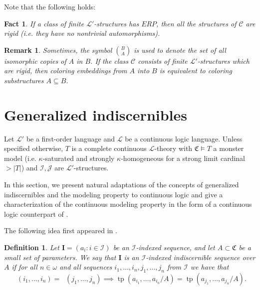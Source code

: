 \documentclass{amsart}
\newtheorem{fact}[teor]{Fact}
\newtheorem{defin}[teor]{Definition}
\newtheorem{remark}[teor]{Remark}
\newtheorem{external claim}[teor]{Claim}
\newcommand{\C}{{\mathfrak C}}
\newcommand{\mL}{\mathcal{L}}
\newcommand{\I}{\mathcal{I}}
\newcommand{\II}{\mathbf{I}}
\DeclareMathOperator{\tp}{{tp}}
\DeclareMathOperator{\qftp}{{tp^{qf}}}
\begin{document}
Note that the following holds:
\begin{fact}
    If a class of finite $\mL'$-structures has $ERP$, then all the structures of $\mathcal{C}$ are rigid (i.e. they have no nontrivial automorphisms).
\end{fact}

\begin{remark}
    Sometimes, the symbol $\binom{B}{A}$ is used to denote the set of all isomorphic copies of $A$ in $B$. If the class $\mathcal{C}$ consists of finite $\mL'$-structures which are rigid, then coloring embeddings from $A$ into $B$ is equivalent to coloring substructures $A\subseteq B$. 
\end{remark}
\section{Generalized indiscernibles}\label{section: modelling property}
Let $\mL'$ be a first-order language and $\mL$ be a continuous logic language. Unless specified otherwise, $T$ is a complete continuous $\mL$-theory with $\C\models T$ a monster model (i.e. $\kappa$-saturated and strongly $\kappa$-homogeneous for a strong limit cardinal $> |T|$) and $\I,\mathcal{J}$ are $\mL'$-structures. %

In this section, we present natural adaptations of the concepts of generalized indiscernibles and the modeling property to continuous logic and give a characterization of the continuous modeling property in the form of a continuous logic counterpart of \cite[Theorem 2.10]{SCOW2021102891}.

The following idea first appeared in \cite[Definition VIII.2.4]{Shelah1982-SHECTA-5}.

\begin{defin}\label{defin: gen. indisc.}%
    Let $\II=(a_i: i\in \I)$ be an $\I$-indexed sequence, and let $A\subset \C$ be a small set of parameters.  We say that $\II$ is an $\I$-\emph{indexed indiscernible sequence over} $A$ if for all $n\in\omega$ and all sequences $i_1,\dots,i_n,j_1,\dots,j_n$ from $\I$ we have that 
    $$\qftp(i_1,\dots,i_n)=\qftp(j_1,\dots,j_n) \implies \tp({a}_{i_1}, \dots, {a}_{i_n}/A)=\tp({a}_{j_1}, \dots, {a}_{j_n}/A).$$
\end{defin}
\end{document}
